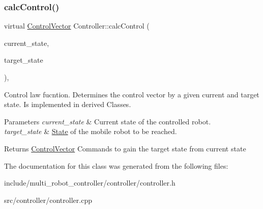 \subsubsection{\texorpdfstring{calc\+Control()}{calcControl()}}
{\footnotesize\ttfamily virtual \hyperlink{structController_1_1ControlVector}{Control\+Vector} Controller\+::calc\+Control (\begin{DoxyParamCaption}\item[{\hyperlink{structController_1_1State}{State}}]{current\+\_\+state,  }\item[{\hyperlink{structController_1_1State}{State}}]{target\+\_\+state }\end{DoxyParamCaption})\hspace{0.3cm}{\ttfamily [protected]}, {}}



Control law fucntion. Determines the control vector by a given current and target state. Is implemented in derived Classes. 


\begin{DoxyParams}{Parameters}
{\em current\+\_\+state} & Current state of the controlled robot. \\
\hline
{\em target\+\_\+state} & \hyperlink{structController_1_1State}{State} of the mobile robot to be reached. \\
\hline
\end{DoxyParams}
\begin{DoxyReturn}{Returns}
\hyperlink{structController_1_1ControlVector}{Control\+Vector} Commands to gain the target state from current state 
\end{DoxyReturn}


The documentation for this class was generated from the following files\+:\begin{DoxyCompactItemize}
\item 
include/multi\+\_\+robot\+\_\+controller/controller/controller.\+h\item 
src/controller/controller.\+cpp\end{DoxyCompactItemize}
